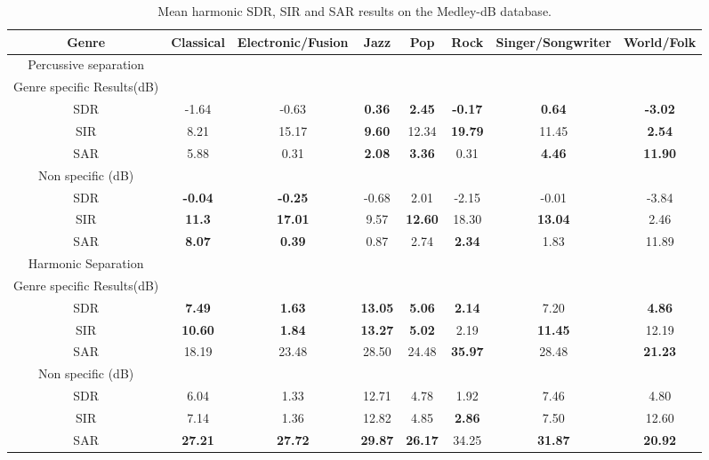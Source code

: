 \documentclass{article}
\begin{document}
\begin{table}
   
   \begin{tabular}{|c|c|c|c|c|c|c|c|}
\hline   
Genre & Classical & Electronic/Fusion & Jazz & Pop & Rock & Singer/Songwriter & World/Folk \\
\hline
Percussive separation & & & & & & & \\
\hline
Genre specific Results(dB)  & & & & & & & \\
SDR & -1.64     & -0.63     &\bf{0.36} & \bf{2.45}&\bf{-0.17}& \bf{0.64} & \bf{-3.02} \\
SIR & 8.21      & 15.17     &\bf{9.60} & 12.34    &\bf{19.79}& 11.45     & \bf{2.54} \\
SAR & 5.88      & 0.31      &\bf{2.08} & \bf{3.36}& 0.31     & \bf{4.46} & \bf{11.90} \\
\hline
Non specific (dB) & & & & & & &\\
SDR & \bf{-0.04}& \bf{-0.25}& -0.68    & 2.01     & -2.15    & -0.01     & -3.84 \\
SIR & \bf{11.3} & \bf{17.01}& 9.57     &\bf{12.60}& 18.30    & \bf{13.04}& 2.46 \\
SAR & \bf{8.07} & \bf{0.39} & 0.87     & 2.74     &\bf{2.34} & 1.83      & 11.89 \\
\hline   
Harmonic Separation &  & & & & & & \\  
\hline
Genre specific Results(dB)  & & & & & & & \\
SDR & \bf{7.49}    & \bf{1.63}    & \bf{13.05} & \bf{5.06}  & \bf{2.14}& 7.20      &\bf{4.86} \\
SIR & \bf{10.60}   & \bf{1.84}    & \bf{13.27} & \bf{5.02 } & 2.19     & \bf{11.45}& 12.19 \\
SAR & 18.19       & 23.48       & 28.50      & 24.48      &\bf{35.97}& 28.48     & \bf{21.23} \\
\hline
Non specific (dB) & & & & & & &\\
SDR & 6.04        & 1.33        & 12.71     & 4.78      & 1.92      & 7.46      & 4.80\\
SIR & 7.14        & 1.36        & 12.82     & 4.85      & \bf{2.86} & 7.50      & 12.60 \\
SAR & \bf{27.21}& \bf{27.72}   & \bf{29.87} & \bf{26.17}& 34.25     &\bf{31.87} & \bf{20.92}\\
\hline
  \end{tabular} 
\caption{\label{specresults} Mean harmonic SDR, SIR and SAR results on the Medley-dB database.}
\end{table}
\end{document}
